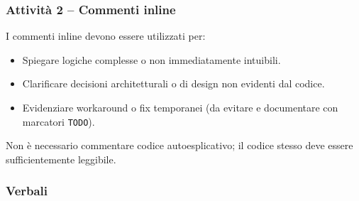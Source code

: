 \documentclass[a4paper, 11pt, oneside]{scrartcl}
\begin{document}
\subsubsection{Attività 2 -- Commenti inline}

I commenti inline devono essere utilizzati per:
\begin{itemize}
    \item Spiegare logiche complesse o non immediatamente intuibili.
    \item Clarificare decisioni architetturali o di design non evidenti dal codice.
    \item Evidenziare workaround o fix temporanei (da evitare e documentare con marcatori \texttt{TODO}).
\end{itemize}
Non è necessario commentare codice autoesplicativo; il codice stesso deve essere sufficientemente leggibile.

\subsubsection{Verbali}
\label{sec:verbali}
\end{document}
